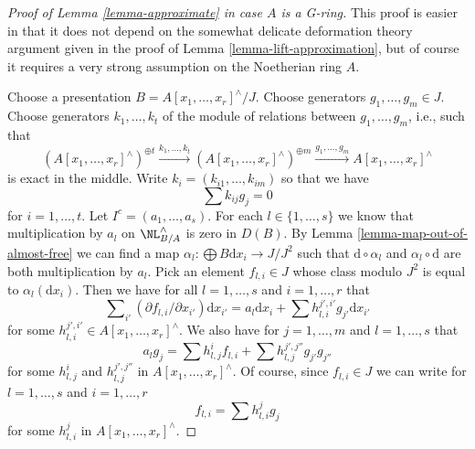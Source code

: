 \begin{proof}[Proof of Lemma \ref{lemma-approximate} in case $A$ is a G-ring]
This proof is easier in that it does not depend on the somewhat
delicate deformation theory argument given in the proof of
Lemma \ref{lemma-lift-approximation}, but of course it requires
a very strong assumption on the Noetherian ring $A$.

\medskip\noindent
Choose a presentation $B = A[x_1, \ldots, x_r]^\wedge/J$.
Choose generators $g_1, \ldots, g_m \in J$.
Choose generators $k_1, \ldots, k_t$ of the module
of relations between $g_1, \ldots, g_m$, i.e., such that
$$
(A[x_1, \ldots, x_r]^\wedge)^{\oplus t} \xrightarrow{k_1, \ldots, k_t}
(A[x_1, \ldots, x_r]^\wedge)^{\oplus m} \xrightarrow{g_1, \ldots, g_m}
A[x_1, \ldots, x_r]^\wedge
$$
is exact in the middle. Write $k_i = (k_{i1}, \ldots, k_{im})$ so that we have
\begin{equation}
\label{equation-relations-straight-up}
\sum k_{ij}g_j = 0
\end{equation}
for $i = 1, \ldots, t$.
Let $I^c = (a_1, \ldots, a_s)$. For each $l \in \{1, \ldots, s\}$
we know that multiplication by $a_l$ on $\NL_{B/A}^\wedge$ is zero
in $D(B)$. By Lemma \ref{lemma-map-out-of-almost-free} we can find a map
$\alpha_l : \bigoplus B\text{d}x_i \to J/J^2$ such that
$\text{d} \circ \alpha_l$ and $\alpha_l \circ \text{d}$ are both
multiplication by $a_l$. Pick an element $f_{l, i} \in J$ whose
class modulo $J^2$ is equal to $\alpha_l(\text{d}x_i)$.
Then we have for all $l = 1, \ldots, s$ and $i = 1, \ldots, r$ that
\begin{equation}
\label{equation-derivatives}
\sum\nolimits_{i'} (\partial f_{l, i}/ \partial x_{i'}) \text{d}x_{i'} =
a_l \text{d}x_i + \sum h_{l, i}^{j', i'} g_{j'} \text{d}x_{i'}
\end{equation}
for some $h_{l, i}^{j', i'} \in A[x_1, \ldots, x_r]^\wedge$.
We also have for $j = 1, \ldots, m$ and $l = 1, \ldots, s$ that
\begin{equation}
\label{equation-ci}
a_l g_j = \sum h_{l, j}^if_{l, i} + \sum h_{l, j}^{j', j''}g_{j'} g_{j''}
\end{equation}
for some $h_{l, j}^i$ and $h_{l, j}^{j', j''}$ in
$A[x_1, \ldots, x_r]^\wedge$. Of course, since $f_{l, i} \in J$
we can write for $l = 1, \ldots, s$ and $i = 1, \ldots, r$
\begin{equation}
\label{equation-in-ideal}
f_{l, i} = \sum h_{l, i}^jg_j
\end{equation}
for some $h_{l, i}^j$ in $A[x_1, \ldots, x_r]^\wedge$.


\end{proof}
